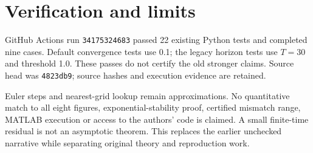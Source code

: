 \documentclass[11pt]{article}
\begin{document}
\section{Verification and limits}
GitHub Actions run \texttt{34175324683} passed 22 existing Python tests and completed nine cases. Default convergence tests use 0.1; the legacy horizon tests use $T=30$ and threshold 1.0. These passes do not certify the old stronger claims. Source head was \texttt{4823db9}; source hashes and execution evidence are retained.

Euler steps and nearest-grid lookup remain approximations. No quantitative match to all eight figures, exponential-stability proof, certified mismatch range, MATLAB execution or access to the authors' code is claimed. A small finite-time residual is not an asymptotic theorem. This replaces the earlier unchecked narrative while separating original theory and reproduction work.
\end{document}
